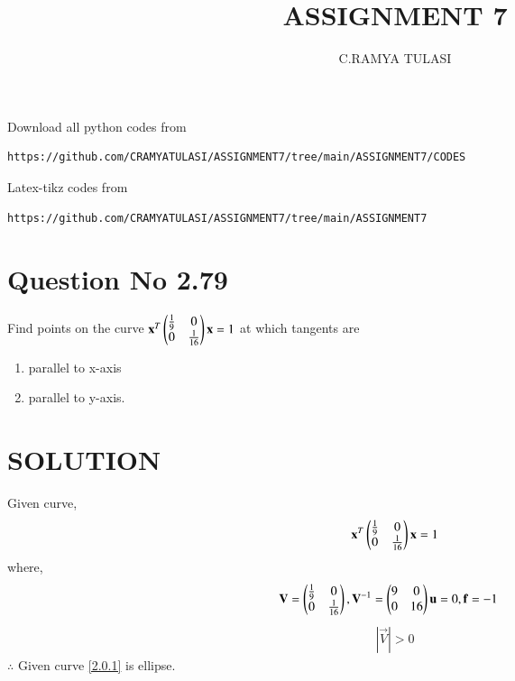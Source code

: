 \documentclass[journal,12pt,twocolumn]{IEEEtran}
\begin{document}
     \def\rightbox#1{\makebox[0in][r]{#1}}
     \def\centbox#1{\makebox[0in]{#1}}
     \def\topbox#1{\raisebox{-\baselineskip}[0in][0in]{#1}}
     \def\midbox#1{\raisebox{-0.5\baselineskip}[0in][0in]{#1}}
\vspace{3cm}
\title{ASSIGNMENT 7}
\author{C.RAMYA TULASI}
\maketitle
\newpage
\bigskip
\renewcommand{\thefigure}{\theenumi}
\renewcommand{\thetable}{\theenumi}
Download all python codes from 
\begin{lstlisting}
https://github.com/CRAMYATULASI/ASSIGNMENT7/tree/main/ASSIGNMENT7/CODES
\end{lstlisting}
%
Latex-tikz codes from 
%
\begin{lstlisting}
https://github.com/CRAMYATULASI/ASSIGNMENT7/tree/main/ASSIGNMENT7
\end{lstlisting}
%
\section{Question No 2.79}
Find points on the curve $\mathbf{x}^T\begin{pmatrix}\frac{1}{9} & 0 \\ 0 & \frac{1}{16}\end{pmatrix}\mathbf{x} = 1$
at which tangents are
\begin{enumerate}
\item  parallel to x-axis
\item  parallel to y-axis.
\end{enumerate}
\section{SOLUTION}
Given curve,
\begin{align}
\mathbf{x}^T\begin{pmatrix}\frac{1}{9} & 0 \\ 0 & \frac{1}{16}\end{pmatrix}\mathbf{x} = 1 \label{2.0.1}
\end{align}
where,
\begin{align}
\mathbf{V}&=\begin{pmatrix}\frac{1}{9} & 0 \\ 0 & \frac{1}{16}\end{pmatrix},\mathbf{V}^{-1}=\begin{pmatrix}9&0\\0&16\end{pmatrix}\mathbf{u}=0, \mathbf{f} = -1 
\end{align}
\begin{align}
|\vec{V}| > 0
\end{align}
$\therefore $ Given curve \eqref{2.0.1} is ellipse.
\end{document}
